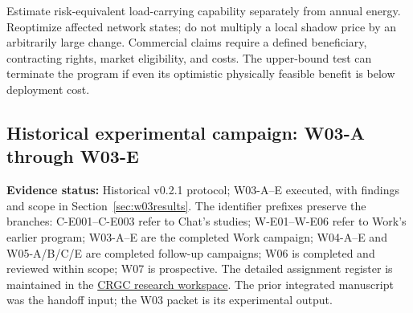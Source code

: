 \documentclass[11pt,letterpaper]{article}
\newcommand{\status}[1]{\textbf{Evidence status:} #1}
\begin{document}
Estimate risk-equivalent load-carrying capability separately from annual energy. Reoptimize affected network states; do not multiply a local shadow price by an arbitrarily large change. Commercial claims require a defined beneficiary, contracting rights, market eligibility, and costs. The upper-bound test can terminate the program if even its optimistic physically feasible benefit is below deployment cost.

\subsection{Historical experimental campaign: W03-A through W03-E}
\label{sec:w03}
\status{Historical v0.2.1 protocol; W03-A--E executed, with findings and scope in Section~\ref{sec:w03results}.} The identifier prefixes preserve the branches: C-E001--C-E003 refer to Chat's studies; W-E01--W-E06 refer to Work's earlier program; W03-A--E are the completed Work campaign; W04-A--E and W05-A/B/C/E are completed follow-up campaigns; W06 is completed and reviewed within scope; W07 is prospective. The detailed assignment register is maintained in the \href{https://chatgpt.com/space/page_dfa9a6f1ac5081919df0487eb77df505}{CRGC research workspace}. The prior integrated manuscript was the handoff input; the W03 packet is its experimental output.
\end{document}
